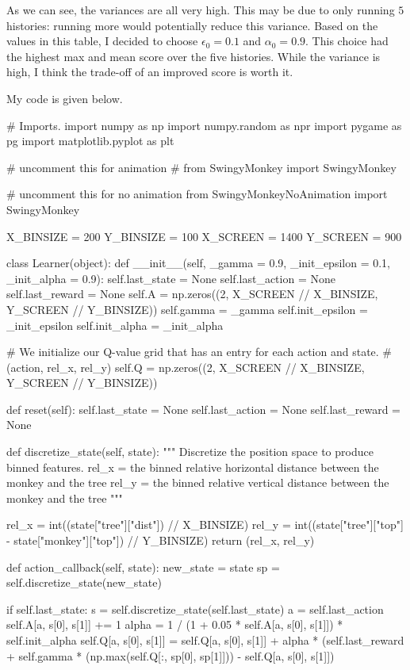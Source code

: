 \documentclass[submit]{harvardml}
\begin{document}
As we can see, the variances are all very high. This may be due to only running $5$ histories: running more would potentially reduce this variance. Based on the values in this table, I decided to choose $\epsilon_0 = 0.1$ and $\alpha_0 = 0.9$. This choice had the highest max and mean score over the five histories. While the variance is high, I think the trade-off of an improved score is worth it.

My code is given below.
\begin{python}
# Imports.
import numpy as np
import numpy.random as npr
import pygame as pg
import matplotlib.pyplot as plt

# uncomment this for animation
# from SwingyMonkey import SwingyMonkey

# uncomment this for no animation
from SwingyMonkeyNoAnimation import SwingyMonkey


X_BINSIZE = 200
Y_BINSIZE = 100
X_SCREEN = 1400
Y_SCREEN = 900


class Learner(object):
    def __init__(self, _gamma = 0.9, _init_epsilon = 0.1, _init_alpha = 0.9):
        self.last_state = None
        self.last_action = None
        self.last_reward = None
        self.A = np.zeros((2, X_SCREEN // X_BINSIZE, Y_SCREEN // Y_BINSIZE))
        self.gamma = _gamma
        self.init_epsilon = _init_epsilon
        self.init_alpha = _init_alpha


        # We initialize our Q-value grid that has an entry for each action and state.
        # (action, rel_x, rel_y)
        self.Q = np.zeros((2, X_SCREEN // X_BINSIZE, Y_SCREEN // Y_BINSIZE))

    def reset(self):
        self.last_state = None
        self.last_action = None
        self.last_reward = None

    def discretize_state(self, state):
        """
        Discretize the position space to produce binned features.
        rel_x = the binned relative horizontal distance between the monkey and the tree
        rel_y = the binned relative vertical distance between the monkey and the tree
        """

        rel_x = int((state["tree"]["dist"]) // X_BINSIZE)
        rel_y = int((state["tree"]["top"] - state["monkey"]["top"]) // Y_BINSIZE)
        return (rel_x, rel_y)

    def action_callback(self, state):
        new_state = state
        sp = self.discretize_state(new_state)

        if self.last_state:
            s = self.discretize_state(self.last_state)
            a = self.last_action
            self.A[a, s[0], s[1]] += 1
            alpha = 1 / (1 + 0.05 * self.A[a, s[0], s[1]]) * self.init_alpha
            self.Q[a, s[0], s[1]] = self.Q[a, s[0], s[1]] + alpha * (self.last_reward + self.gamma * (np.max(self.Q[:, sp[0], sp[1]])) - self.Q[a, s[0], s[1]])
        

\end{python}
\end{document}
